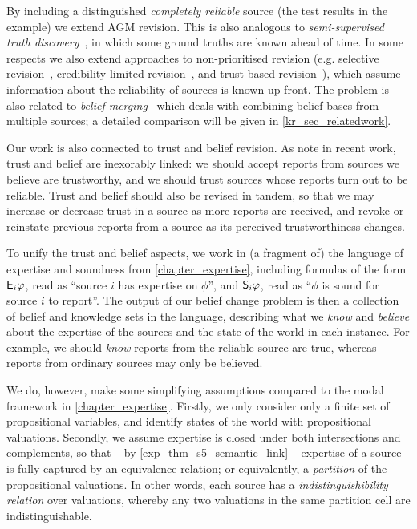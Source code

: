 By including a distinguished \emph{completely reliable} source (the test
results in the example) we extend AGM revision. This is also analogous to
\emph{semi-supervised truth
discovery}~\cite{yin_supervised_2011,rekatsinas2017slimfast}, in which some
ground truths are known ahead of time. In some respects we also extend
approaches to non-prioritised revision (e.g. selective
revision~\cite{ferme1999selective}, credibility-limited
revision~\cite{hansson_2001}, and trust-based
revision~\cite{booth_trust_2018}), which assume information about the
reliability of sources is known up front. The problem is also related to
\emph{belief merging}~\cite{konieczny2002merging} which deals with combining
belief bases from multiple sources; a detailed comparison will be given in
\cref{kr_sec_relatedwork}.

Our work is also connected to trust and belief revision. As
\textcite{yasser_21} note in recent work, trust and belief are inexorably
linked: we should accept reports from sources we believe are trustworthy, and
we should trust sources whose reports turn out to be reliable. Trust and belief
should also be revised in tandem, so that we may increase or decrease trust in
a source as more reports are received, and revoke or reinstate previous reports
from a source as its perceived trustworthiness changes.

To unify the trust and belief aspects, we work in (a fragment of) the language
of expertise and soundness from \cref{chapter_expertise}, including formulas of
the form $\E_i\phi$, read as ``source $i$ has expertise on $\phi$'', and
$\S_i\phi$, read as ``$\phi$ is sound for source $i$ to report''. The output of
our belief change problem is then a collection of belief and knowledge sets in
the language, describing what we \emph{know} and \emph{believe} about the
expertise of the sources and the state of the world in each instance. For
example, we should \emph{know} reports from the reliable source are true,
whereas reports from ordinary sources may only be believed.

We do, however, make some simplifying assumptions compared to the modal
framework in \cref{chapter_expertise}. Firstly, we only consider only a finite
set of propositional variables, and identify states of the world with
propositional valuations. Secondly, we assume expertise is closed under both
intersections and complements, so that -- by \cref{exp_thm_s5_semantic_link} --
expertise of a source is fully captured by an equivalence relation; or
equivalently, a \emph{partition} of the propositional valuations.  In other
words, each source has a \emph{indistinguishibility relation} over valuations,
whereby any two valuations in the same partition cell are indistinguishable.

